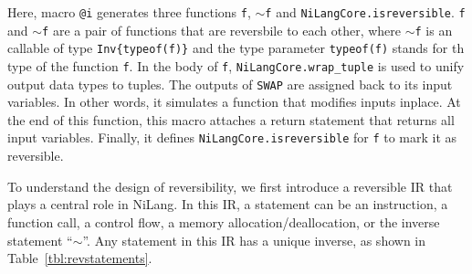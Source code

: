 \documentclass{article}
\newcommand{\<}{\langle}
\renewcommand{\>}{\rangle}
\newcommand{\Tbl}[1]{Table~\ref{#1}}
\theoremstyle{definition}\newtheorem{definition}{\textit{Definition}}
\begin{document}
Here, macro \texttt{@i} generates three functions \texttt{f}, \texttt{$\sim$f} and \texttt{NiLangCore.isreversible}. \texttt{f} and \texttt{$\sim$f} are a pair of functions that are reversbile to each other, where \texttt{$\sim$f} is an callable of type \texttt{Inv\{typeof(f)\}} and the type parameter \texttt{typeof(f)} stands for th type of the function \texttt{f}.
In the body of \texttt{f}, \texttt{NiLangCore.wrap\_tuple} is used to unify output data types to tuples.
The outputs of \texttt{SWAP} are assigned back to its input variables. In other words, it simulates a function that modifies inputs inplace.
At the end of this function, this macro attaches a return statement that returns all input variables.
Finally, it defines \texttt{NiLangCore.isreversible} for \texttt{f} to mark it as reversible.

To understand the design of reversibility, we first introduce a reversible IR that plays a central role in NiLang.
In this IR, a statement can be an instruction, a function call, a control flow, a memory allocation/deallocation, or the inverse statement ``$\sim$''.
Any statement in this IR has a unique inverse, as shown in \Tbl{tbl:revstatements}.
\end{document}
